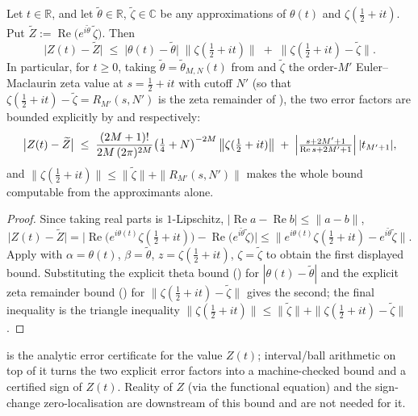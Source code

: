 \begin{theorem}
\label{thm:hz_Z_bound}
\leanok
{}
Let $t\in\mathbb{R}$, and let $\widetilde\theta\in\mathbb{R}$, $\widetilde\zeta\in\mathbb{C}$
be any approximations of $\theta(t)$ and $\zeta(\tfrac12+it)$. Put
$\widetilde Z:=\operatorname{Re}\bigl(e^{i\widetilde\theta}\,\widetilde\zeta\bigr)$. Then
\[
  \bigl|Z(t)-\widetilde Z\bigr|
  \;\le\;\bigl\lvert\theta(t)-\widetilde\theta\bigr\rvert\;\bigl\|\zeta(\tfrac12+it)\bigr\|
    \;+\;\bigl\|\zeta(\tfrac12+it)-\widetilde\zeta\bigr\|.
\]
In particular, for $t\ge0$, taking $\widetilde\theta=\widetilde\theta_{M,N}(t)$ from
 and $\widetilde\zeta$ the order-$M'$ Euler--Maclaurin zeta
value at $s=\tfrac12+it$ with cutoff $N'$ (so that
$\zeta(\tfrac12+it)-\widetilde\zeta=R_{M'}(s,N')$ is the zeta remainder of
), the two error factors are bounded explicitly by
 and  respectively:
\[
  \bigl|Z(t)-\widetilde Z\bigr|
  \;\le\;\frac{(2M+1)!}{2M\,(2\pi)^{2M}}\bigl(\tfrac14+N\bigr)^{-2M}\,\bigl\|\zeta(\tfrac12+it)\bigr\|
    \;+\;\Bigl|\tfrac{s+2M'+1}{\operatorname{Re}s+2M'+1}\Bigr|\,\lvert t_{M'+1}\rvert,
\]
and $\|\zeta(\tfrac12+it)\|\le\|\widetilde\zeta\|+\|R_{M'}(s,N')\|$ makes the whole
bound computable from the approximants alone.
\end{theorem}

\begin{proof}
\leanok
{}
Since taking real parts is $1$-Lipschitz, $|\operatorname{Re}a-\operatorname{Re}b|\le\|a-b\|$,
\[
  \bigl|Z(t)-\widetilde Z\bigr|
  =\bigl|\operatorname{Re}\bigl(e^{i\theta(t)}\zeta(\tfrac12+it)\bigr)-\operatorname{Re}\bigl(e^{i\widetilde\theta}\widetilde\zeta\bigr)\bigr|
  \le\bigl\|e^{i\theta(t)}\zeta(\tfrac12+it)-e^{i\widetilde\theta}\widetilde\zeta\bigr\|.
\]
Apply  with $\alpha=\theta(t)$, $\beta=\widetilde\theta$,
$z=\zeta(\tfrac12+it)$, $\zeta=\widetilde\zeta$ to obtain the first displayed bound.
Substituting the explicit theta bound () for
$|\theta(t)-\widetilde\theta|$ and the explicit zeta remainder bound
() for $\|\zeta(\tfrac12+it)-\widetilde\zeta\|$ gives the
second; the final inequality is the triangle inequality
$\|\zeta(\tfrac12+it)\|\le\|\widetilde\zeta\|+\|\zeta(\tfrac12+it)-\widetilde\zeta\|$.
\end{proof}

\begin{remark}[Scope]
\label{rem:hz_scope}
 is the analytic error certificate for the value $Z(t)$;
interval/ball arithmetic on top of it turns the two explicit error factors into a
machine-checked bound and a certified sign of $Z(t)$. Reality of $Z$ (via the functional equation) and the
sign-change zero-localisation are downstream of this bound and are not needed for it.
\end{remark}
